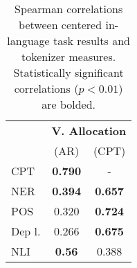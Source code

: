 \begin{table}
\centering

\begin{tabular}{lcc}
\toprule
 & \multicolumn{2}{c}{\bf{V. Allocation}} \\
 & (AR) &  (CPT) \\
\midrule
CPT    &    \bf{0.790} &     - \\
NER    &   \bf{0.394} &   \bf{0.657}  \\
POS    &     0.320 &   \bf{0.724} \\
Dep l. &     0.266 &   \bf{0.675} \\
NLI   &    \bf{0.56} &    0.388 \\ 
\bottomrule
\end{tabular}
\caption{Spearman correlations between centered in-language task results and tokenizer measures. Statistically significant correlations ($p<0.01$) are bolded.}
\label{tab:corr_in_lang_20l}
\end{table}